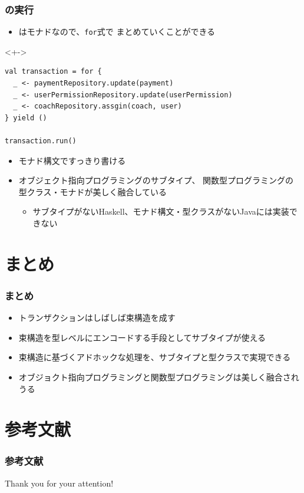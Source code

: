 \begin{frame}[fragile]
  \frametitle{\Fujitask の実行}

  \begin{itemize}
    \item<+-> \Fujitask はモナドなので、\lstinline|for|式で
    まとめていくことができる
  \end{itemize}

  \begin{uncoverenv}<+->
\begin{lstlisting}[style=scala]
val transaction = for {
  _ <- paymentRepository.update(payment)
  _ <- userPermissionRepository.update(userPermission)
  _ <- coachRepository.assgin(coach, user)
} yield ()

transaction.run()
\end{lstlisting}
  \end{uncoverenv}

  \begin{itemize}
    \item<+-> モナド構文ですっきり書ける

    \item<+-> オブジェクト指向プログラミングのサブタイプ、
    関数型プログラミングの型クラス・モナドが美しく融合している
    \begin{itemize}
      \item サブタイプがないHaskell、モナド構文・型クラスがないJavaに\Fujitask は実装できない
    \end{itemize}
  \end{itemize}
\end{frame}

\section{まとめ}

\begin{frame}
  \frametitle{まとめ}

  \pause
  \begin{itemize}
    \item<+-> トランザクションはしばしば束構造を成す
    \item<+-> 束構造を型レベルにエンコードする手段としてサブタイプが使える
    \item<+-> 束構造に基づくアドホックな処理を、サブタイプと型クラスで実現できる
    \item<+-> オブジョクト指向プログラミングと関数型プログラミングは美しく融合されうる
  \end{itemize}
\end{frame}

\section*{参考文献}

\begin{frame}
  \frametitle{参考文献}

  
  \nocite{*}
  
\end{frame}

\begin{frame}
  \centering
  {\Huge Thank you for your attention!}
\end{frame}



